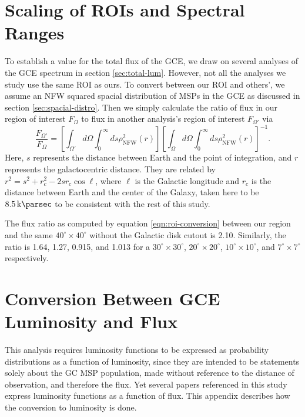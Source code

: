 \documentclass[a4paper,11pt]{article}
\newcommand{\brackets}[1]{\left[#1\right]}
\newcommand{\comment}[1]{\emph{\color{red}{#1}}}
\begin{document}
\section{Scaling of ROIs and Spectral Ranges}
\label{app:roi-rescale}
To establish a value for the total flux of the GCE, we draw on several analyses of the GCE spectrum in section \ref{sec:total-lum}. However, not all the analyses we study use the same ROI as ours. To convert between our ROI and others', we assume an NFW squared spacial distribution of MSPs in the GCE as discussed in section \ref{sec:spacial-distro}. Then we simply calculate the ratio of flux in our region of interest $F_\Omega$ to flux in another analysis's region of interest $F_{\Omega'}$ via
\begin{equation}
    \frac{F_{\Omega'}}{F_\Omega} = \brackets{\int_{\Omega'}d\Omega\int_0^\infty ds \rho_\text{NFW}^2 (r)}\brackets{\int_{\Omega}d\Omega\int_0^\infty ds \rho_\text{NFW}^2 (r)}^{-1}.
    \label{eqn:roi-conversion}
\end{equation}
Here, $s$ represents the distance between Earth and the point of integration, and $r$ represents the galactocentric distance. They are related by $r^2 = s^2 + r_c^2 - 2 s r_c \cos\ell$, where $\ell$ is the Galactic longitude and $r_c$ is the distance between Earth and the center of the Galaxy, taken here to be $\SI{8.5}{\kilo\parsec}$ to be consistent with the rest of this study.

The flux ratio as computed by equation \ref{eqn:roi-conversion} between our region and the same $40^\circ \times 40^\circ$ without the Galactic disk cutout is 2.10. Similarly, the ratio is 1.64, 1.27, 0.915, and 1.013 \comment{Wrong!} for a $30^\circ \times 30^\circ $, $20^\circ \times 20^\circ$, $10^\circ \times 10^\circ$, and $7^\circ \times 7^\circ$ respectively.


\section{Conversion Between GCE Luminosity and Flux}
\label{app:lum-to-flux}
This analysis requires luminosity functions to be expressed as probability distributions as a function of luminosity, since they are intended to be statements solely about the GC MSP population, made without reference to the distance of observation, and therefore the flux. Yet several papers referenced in this study express luminosity functions as a function of flux. This appendix describes how the conversion to luminosity is done.
\end{document}
